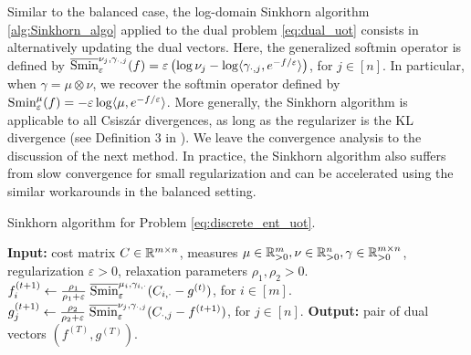 Similar to the balanced case, the log-domain Sinkhorn algorithm \ref{alg:Sinkhorn_algo}
applied to the dual problem \ref{eq:dual_uot} consists in alternatively updating the dual vectors.
Here, the generalized softmin operator is defined by
$\overline{\text{Smin}}^{\nu_j, \gamma_{\cdot, j}}_{\varepsilon}(f) =
\varepsilon \left( \log \nu_j - \log \langle \gamma_{\cdot, j}, e^{-f / \varepsilon} \rangle \right)$,
for $j \in [n]$. In particular, when $\gamma = \mu \otimes \nu$, we recover the softmin operator
\citep{Sejourne19} defined by
$\text{Smin}^{\mu}_{\varepsilon}(f) = -\varepsilon \log \langle \mu, e^{-f / \varepsilon} \rangle$.
More generally, the Sinkhorn algorithm is applicable to all Csiszár divergences,
as long as the regularizer is the KL divergence (see Definition 3 in \citep{Sejourne19}).
We leave the convergence analysis to the discussion of the next method.
In practice, the Sinkhorn algorithm also suffers from slow convergence for small regularization
and can be accelerated using the similar workarounds in the balanced setting.

\begin{algorithm}[t]
  \caption{Sinkhorn algorithm for Problem \ref{eq:discrete_ent_uot}.}
  \label{alg:Sinkhorn_algo}
\begin{algorithmic}[1]
  \STATE \textbf{Input:} cost matrix $C \in \mathbb R^{m \times n}$,
  measures $\mu \in \mathbb R^m_{> 0}, \nu \in \mathbb R^n_{> 0}, \gamma \in \mathbb R^{m \times n}_{> 0}$,
  regularization $\varepsilon > 0$, relaxation parameters $\rho_1, \rho_2 > 0$.
  \STATE $f_i^{(t+1)} \gets \frac{\rho_1}{\rho_1 + \varepsilon} \; \overline{\text{Smin}}^{\mu_i, \gamma_{i, \cdot}}_{\varepsilon}(C_{i, \cdot} - g^{(t)})$, for $i \in [m]$.
  \STATE $g_j^{(t+1)} \gets \frac{\rho_2}{\rho_2 + \varepsilon} \; \overline{\text{Smin}}^{\nu_j, \gamma_{\cdot, j}}_{\varepsilon}(C_{\cdot, j} - f^{(t+1)})$, for $j \in [n]$.
  \ENDFOR
  \STATE \textbf{Output:} pair of dual vectors $(f^{(T)}, g^{(T)})$.
\end{algorithmic}
\end{algorithm}

